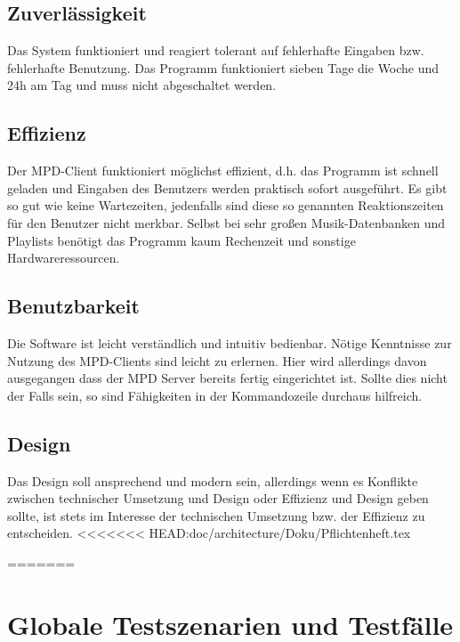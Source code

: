 \subsection{Zuverlässigkeit}
Das System funktioniert und reagiert tolerant auf fehlerhafte Eingaben bzw. fehlerhafte Benutzung.
Das Programm funktioniert sieben Tage die Woche und 24h am Tag und muss nicht abgeschaltet werden.

\subsection{Effizienz}
Der MPD-Client funktioniert möglichst effizient, d.h. das Programm ist schnell geladen und Eingaben des Benutzers
werden praktisch sofort ausgeführt. Es gibt so gut wie keine Wartezeiten, jedenfalls sind diese 
so genannten Reaktionszeiten für den Benutzer nicht merkbar. Selbst bei sehr großen Musik-Datenbanken
und Playlists benötigt das Programm kaum Rechenzeit und sonstige Hardwareressourcen.

\subsection{Benutzbarkeit}
Die Software ist leicht verständlich und intuitiv bedienbar. Nötige Kenntnisse zur Nutzung des 
MPD-Clients sind leicht zu erlernen. Hier wird allerdings davon ausgegangen dass der MPD Server bereits
fertig eingerichtet ist. Sollte dies nicht der Falls sein, so sind Fähigkeiten in der Kommandozeile 
durchaus hilfreich.

\subsection{Design}
Das Design soll ansprechend und modern sein, allerdings wenn es Konflikte zwischen technischer Umsetzung 
und Design oder Effizienz und Design geben sollte, ist stets im Interesse der technischen Umsetzung bzw. 
der Effizienz zu entscheiden.
<<<<<<< HEAD:doc/architecture/Doku/Pflichtenheft.tex

=======
\section{Globale Testszenarien und Testfälle}
